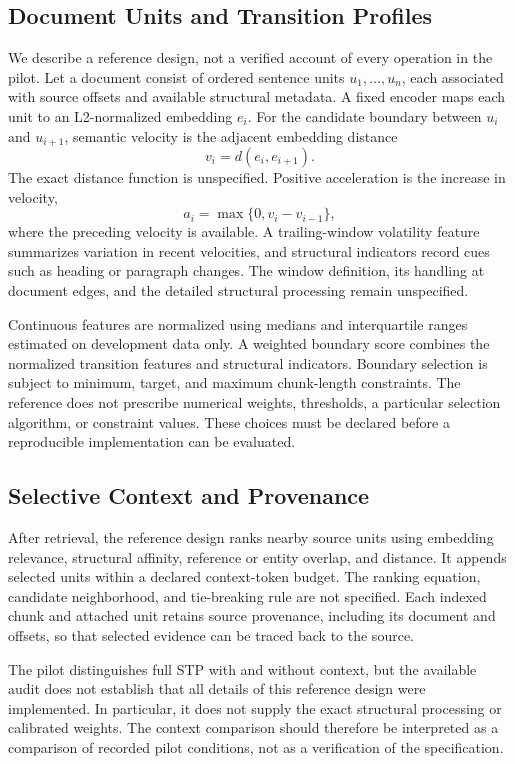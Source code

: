 \documentclass[10pt]{article}
\begin{document}
\subsection{Document Units and Transition Profiles}

We describe a reference design, not a verified account of every operation in the pilot. Let a document consist of ordered sentence units $u_1,\ldots,u_n$, each associated with source offsets and available structural metadata. A fixed encoder maps each unit to an L2-normalized embedding $e_i$. For the candidate boundary between $u_i$ and $u_{i+1}$, semantic velocity is the adjacent embedding distance
\[
v_i=d(e_i,e_{i+1}).
\]
The exact distance function is unspecified. Positive acceleration is the increase in velocity,
\[
a_i=\max\{0,v_i-v_{i-1}\},
\]
where the preceding velocity is available. A trailing-window volatility feature summarizes variation in recent velocities, and structural indicators record cues such as heading or paragraph changes. The window definition, its handling at document edges, and the detailed structural processing remain unspecified.

Continuous features are normalized using medians and interquartile ranges estimated on development data only. A weighted boundary score combines the normalized transition features and structural indicators. Boundary selection is subject to minimum, target, and maximum chunk-length constraints. The reference does not prescribe numerical weights, thresholds, a particular selection algorithm, or constraint values. These choices must be declared before a reproducible implementation can be evaluated.

\subsection{Selective Context and Provenance}

After retrieval, the reference design ranks nearby source units using embedding relevance, structural affinity, reference or entity overlap, and distance. It appends selected units within a declared context-token budget. The ranking equation, candidate neighborhood, and tie-breaking rule are not specified. Each indexed chunk and attached unit retains source provenance, including its document and offsets, so that selected evidence can be traced back to the source.

The pilot distinguishes full STP with and without context, but the available audit does not establish that all details of this reference design were implemented. In particular, it does not supply the exact structural processing or calibrated weights. The context comparison should therefore be interpreted as a comparison of recorded pilot conditions, not as a verification of the specification.
\end{document}
